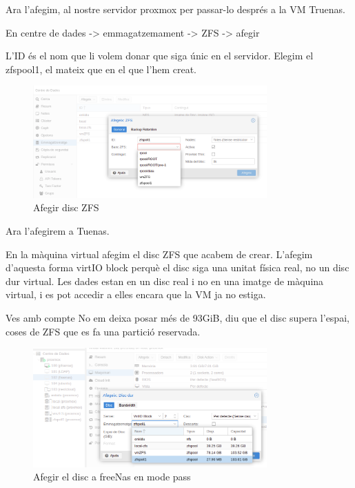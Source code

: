 \documentclass[
  10pt,
]{krantz}
\begin{document}
Ara l'afegim, al nostre servidor proxmox per passar-lo després a la VM Truenas.

En centre de dades -\textgreater{} emmagatzemament -\textgreater{} ZFS -\textgreater{} afegir

L'ID és el nom que li volem donar que siga únic en el servidor. Elegim el zfspool1, el mateix que en el que l'hem creat.

\begin{figure}
\centering
\includegraphics[width=0.8\textwidth,height=\textheight]{imatges/proxmox/afegir_pool.png}
\caption{Afegir disc ZFS}
\end{figure}

Ara l'afegirem a Tuenas.

En la màquina virtual afegim el disc ZFS que acabem de crear. L'afegim d'aquesta forma virtIO block perquè el disc siga una unitat física real, no un disc dur virtual. Les dades estan en un disc real i no en una imatge de màquina virtual, i es pot accedir a elles encara que la VM ja no estiga.

\begin{rmdcuidao}{Ves amb compte}
No em deixa posar més de 93GiB, diu que el disc supera l'espai, coses de ZFS que es fa una partició reservada.

\end{rmdcuidao}

\begin{figure}
\centering
\includegraphics[width=0.8\textwidth,height=\textheight]{imatges/proxmox/disc_freenas.png}
\caption{Afegir el disc a freeNas en mode pass}
\end{figure}
\end{document}
